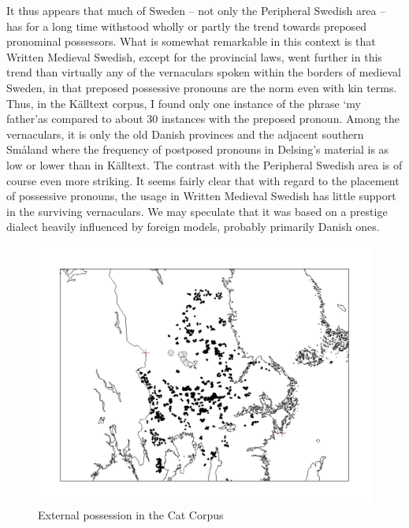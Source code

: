 It thus appears that much of Sweden – not only the Peripheral Swedish area – has for a long time withstood wholly or partly the trend towards preposed pronominal possessors. What is somewhat remarkable in this context is that Written Medieval Swedish, except for the provincial laws, went further in this trend than virtually any of the vernaculars spoken within the borders of medieval Sweden, in that preposed possessive pronouns are the norm even with kin terms. Thus, in the Källtext corpus, I found only one instance of the phrase ‘my father’\textstyleLinguisticExample{ }as compared to about 30 instances with the preposed pronoun. Among the vernaculars, it is only the old Danish provinces and the adjacent southern Småland where the frequency of postposed pronouns in Delsing’s material is as low or lower than in Källtext. The contrast with the Peripheral Swedish area is of course even more striking. It seems fairly clear that with regard to the placement of possessive pronouns, the usage in Written Medieval Swedish has little support in the surviving vernaculars. We may speculate that it was based on a prestige dialect heavily influenced by foreign models, probably primarily Danish ones.

 

\begin{figure}[h]

\includegraphics{figures_mod/image20}
\caption{External possession in the Cat Corpus}
\label{map:20}

\end{figure}

